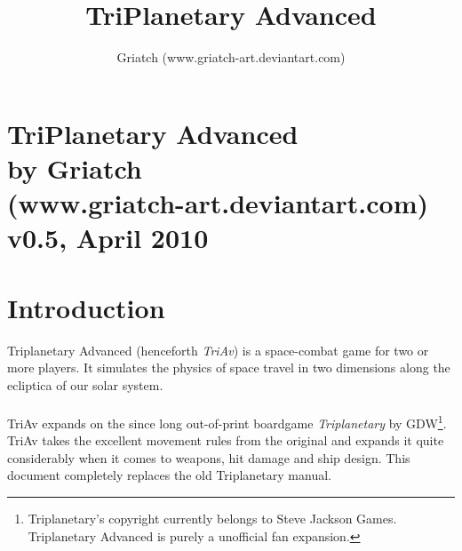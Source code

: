 \documentclass[a4paper,12pt,notitlepage,twocolumn]{article}
\title{TriPlanetary Advanced}
\author{Griatch (www.griatch-art.deviantart.com)}   %
\begin{document}



\section*{\center TriPlanetary Advanced\\by Griatch \\
   {\small (www.griatch-art.deviantart.com)}\\ {\small v0.5, April 2010}}

\section{Introduction}
Triplanetary Advanced (henceforth \emph{TriAv}) is a
space-combat game for two or more players. It simulates the physics of
space travel in two dimensions along the ecliptica of our solar
system. 
\\\\
TriAv expands on the since long out-of-print boardgame \emph{Triplanetary}
by GDW\footnote{Triplanetary's
  copyright currently belongs to Steve Jackson Games. Triplanetary
  Advanced is purely a unofficial fan expansion.}.
 TriAv takes the excellent movement rules from the original and
expands it quite considerably when it comes to weapons, hit damage and ship
design. This document completely replaces the old Triplanetary manual.
\end{document}
